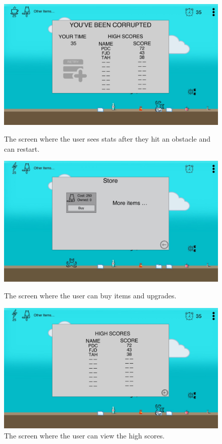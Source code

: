\documentclass[10pt,conference,onecolumn,compsoc]{IEEEtran}
\begin{document}
\begin{figure}[!ht]
\centering
\includegraphics[scale=.2]{MockupEndgame.jpeg}
\caption{The screen where the user sees stats after they hit an obstacle and can restart.}

\includegraphics[scale=.2]{MockupStore.jpeg}
\caption{The screen where the user can buy items and upgrades.}

\includegraphics[scale=.2]{MockupHighscores.jpeg}
\caption{The screen where the user can view the high scores.}

\end{figure}
\end{document}
